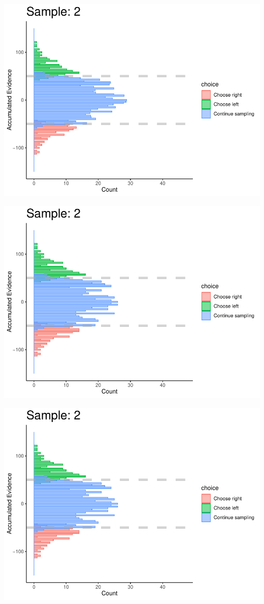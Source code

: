 \documentclass[
]{book}
\begin{document}
\begin{center}\includegraphics[width=0.8\linewidth]{LateNightBayes_files/figure-latex/fixed_check-10} \end{center}

\begin{center}\includegraphics[width=0.8\linewidth]{LateNightBayes_files/figure-latex/fixed_check-11} \end{center}

\begin{center}\includegraphics[width=0.8\linewidth]{LateNightBayes_files/figure-latex/fixed_check-12} \end{center}
\end{document}
